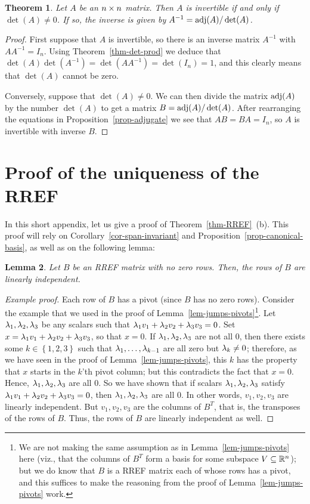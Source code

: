 \documentclass[reqno]{amsart}
\newtheorem{theorem}{Theorem}[section]
\newtheorem{lemma}[theorem]{Lemma}
\theoremstyle{definition}
\begin{document}
\begin{theorem}\label{thm-inv-det}
 Let $A$ be an $n\times n$ matrix.  Then $A$ is invertible if and only if
 $\det(A)\neq 0$.  If so, the inverse is given by
 $A^{-1}=\operatorname{adj}(A)/\det(A)$.
\end{theorem}
\begin{proof}
 First suppose that $A$ is invertible, so there is an inverse matrix
 $A^{-1}$ with $AA^{-1}=I_n$.  Using Theorem~\ref{thm-det-prod} we
 deduce that $\det(A)\det(A^{-1})=\det(AA^{-1})=\det(I_n)=1$, and this
 clearly means that $\det(A)$ cannot be zero.

 Conversely, suppose that $\det(A)\neq 0$.  We can then divide the
 matrix $\operatorname{adj}(A)$ by the number $\det(A)$ to get a matrix
 $B=\operatorname{adj}(A)/\det(A)$.  After rearranging the equations in
 Proposition~\ref{prop-adjugate} we see that $AB=BA=I_n$, so $A$ is
 invertible with inverse $B$.
\end{proof}

\section{Proof of the uniqueness of the RREF}
\label{apx-RREF-uniq}

In this short appendix, let us give a proof of
Theorem~\ref{thm-RREF}~(b).
This proof will rely on Corollary~\ref{cor-span-invariant}
and Proposition~\ref{prop-canonical-basis},
as well as on the following lemma:

\begin{lemma}\label{lem-RREF-lin-ind}
 Let $B$ be an RREF matrix with no zero rows.
 Then, the rows of $B$ are linearly independent.
\end{lemma}
\begin{proof}[Example proof]
 Each row of $B$ has a pivot (since $B$ has no zero rows).
 Consider the example that we used in the proof of
 Lemma~\ref{lem-jumps-pivots}\footnote{We are not
 making the same assumption
 as in Lemma~\ref{lem-jumps-pivots} here (viz., that
 the columns of $B^T$ form a basis for some subspace
 $V \subseteq {\mathbb{R}}^n$); but we do know that $B$ is a
 RREF matrix each of whose rows has a pivot, and this
 suffices to make the reasoning from the proof of
 Lemma~\ref{lem-jumps-pivots} work.}.
 Let $\lambda_1, \lambda_2, \lambda_3$ be any scalars
 such that $\lambda_1 v_1 + \lambda_2 v_2 + \lambda_3 v_3 = 0$.
 Set $x = \lambda_1 v_1 + \lambda_2 v_2 + \lambda_3 v_3$,
 so that $x = 0$.
 If $\lambda_1, \lambda_2, \lambda_3$ are not all $0$,
 then there exists some $k \in \left\{1,2,3\right\}$
 such that $\lambda_1,\dotsc,\lambda_{k-1}$ are all
 zero but $\lambda_k\neq 0$;
 therefore, as we have seen in the proof of
 Lemma~\ref{lem-jumps-pivots}, this $k$
 has the property that $x$ starts in the $k$'th pivot
 column;
 but this contradicts the fact that $x = 0$.
 Hence, $\lambda_1, \lambda_2, \lambda_3$ are all $0$.
 So we have shown that if scalars $\lambda_1, \lambda_2, \lambda_3$
 satisfy $\lambda_1 v_1 + \lambda_2 v_2 + \lambda_3 v_3 = 0$,
 then $\lambda_1, \lambda_2, \lambda_3$ are all $0$.
 In other words, $v_1, v_2, v_3$ are linearly independent.
 But $v_1, v_2, v_3$ are the columns of $B^T$, that is,
 the transposes of the rows of $B$.
 Thus, the rows of $B$ are linearly independent as well.
\end{proof}
\end{document}
